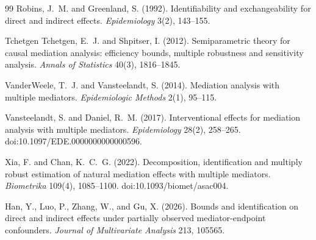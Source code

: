 \documentclass[11pt]{article}
\theoremstyle{definition}
\theoremstyle{plain}
\theoremstyle{remark}
\begin{document}
\begin{thebibliography}{99}
Robins, J.~M. and Greenland, S. (1992).
\newblock Identifiability and exchangeability for direct and indirect effects.
\newblock \emph{Epidemiology} 3(2), 143--155.

Tchetgen Tchetgen, E.~J. and Shpitser, I. (2012).
\newblock Semiparametric theory for causal mediation analysis: efficiency
bounds, multiple robustness and sensitivity analysis.
\newblock \emph{Annals of Statistics} 40(3), 1816--1845.

VanderWeele, T.~J. and Vansteelandt, S. (2014).
\newblock Mediation analysis with multiple mediators.
\newblock \emph{Epidemiologic Methods} 2(1), 95--115.

Vansteelandt, S. and Daniel, R.~M. (2017).
\newblock Interventional effects for mediation analysis with multiple
mediators.
\newblock \emph{Epidemiology} 28(2), 258--265. doi:10.1097/EDE.0000000000000596.

Xia, F. and Chan, K.~C.~G. (2022).
\newblock Decomposition, identification and multiply robust estimation of
natural mediation effects with multiple mediators.
\newblock \emph{Biometrika} 109(4), 1085--1100. doi:10.1093/biomet/asac004.

Han, Y., Luo, P., Zhang, W., and Gu, X. (2026).
\newblock Bounds and identification on direct and indirect effects under
partially observed mediator-endpoint confounders.
\newblock \emph{Journal of Multivariate Analysis} 213, 105565.
\end{thebibliography}
\end{document}
